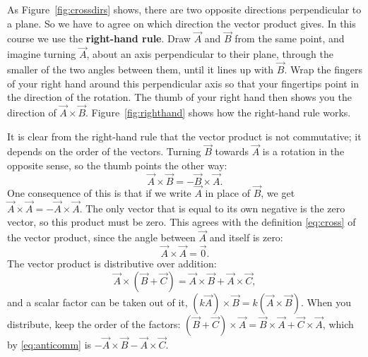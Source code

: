 \documentclass[11pt,a4paper]{article}
\begin{document}
As Figure~\ref{fig:crossdirs} shows, there are two opposite directions perpendicular to a plane. So
we have to agree on which direction the vector product gives. In this course we use the
\textbf{right-hand rule}. Draw $\vec{A}$ and $\vec{B}$ from the same point, and imagine turning
$\vec{A}$, about an axis perpendicular to their plane, through the smaller of the two angles between
them, until it lines up with $\vec{B}$. Wrap the fingers of your right hand around this
perpendicular axis so that your fingertips point in the direction of the rotation. The thumb of
your right hand then shows you the direction of $\vec{A}\times\vec{B}$. Figure~\ref{fig:righthand}
shows how the right-hand rule works.

It is clear from the right-hand rule that the vector product is not commutative; it depends on the
order of the vectors. Turning $\vec{B}$ towards $\vec{A}$ is a rotation in the opposite sense, so
the thumb points the other way:
\begin{equation}\label{eq:anticomm}
  \vec{A}\times\vec{B} = -\vec{B}\times\vec{A} .
\end{equation}
One consequence of this is that if we write $\vec{A}$ in place of $\vec{B}$, we get
$\vec{A}\times\vec{A} = -\vec{A}\times\vec{A}$. The only vector that is equal to its own negative
is the zero vector, so this product must be zero. This agrees with the definition
\eqref{eq:cross} of the vector product, since the angle between $\vec{A}$ and itself is zero:
\begin{equation}\label{eq:AxA}
  \vec{A}\times\vec{A} = \vec{0} .
\end{equation}
The vector product is distributive over addition:
\begin{equation}\label{eq:crossdistr}
  \vec{A}\times(\vec{B}+\vec{C}) = \vec{A}\times\vec{B} + \vec{A}\times\vec{C} ,
\end{equation}
and a scalar factor can be taken out of it, $(k\vec{A})\times\vec{B} = k(\vec{A}\times\vec{B})$.
When you distribute, keep the order of the factors: $(\vec{B}+\vec{C})\times\vec{A} =
\vec{B}\times\vec{A} + \vec{C}\times\vec{A}$, which by \eqref{eq:anticomm} is
$-\vec{A}\times\vec{B} - \vec{A}\times\vec{C}$.
\end{document}
